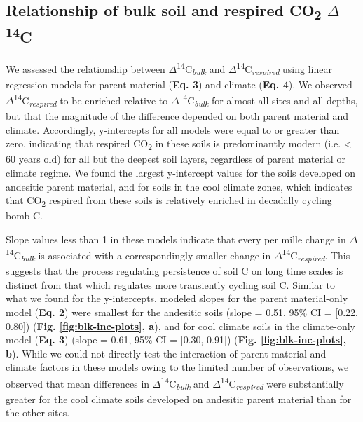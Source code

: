 \documentclass[english,man,floatsintext]{apa6}
\begin{document}
\hypertarget{relationship-of-bulk-soil-and-respired-co2-delta14c}{%
\subsection{\texorpdfstring{Relationship of bulk soil and respired CO\textsubscript{2} \(\Delta\)\textsuperscript{14}C}{Relationship of bulk soil and respired CO2 \textbackslash{}Delta14C}}\label{relationship-of-bulk-soil-and-respired-co2-delta14c}}

We assessed the relationship between \(\Delta\)\textsuperscript{14}C\textsubscript{\emph{bulk}} and \(\Delta\)\textsuperscript{14}C\textsubscript{\emph{respired}} using linear regression models for parent material (\textbf{Eq. 3}) and climate (\textbf{Eq. 4}). We observed \(\Delta\)\textsuperscript{14}C\textsubscript{\emph{respired}} to be enriched relative to \(\Delta\)\textsuperscript{14}C\textsubscript{\emph{bulk}} for almost all sites and all depths, but that the magnitude of the difference depended on both parent material and climate. Accordingly, y-intercepts for all models were equal to or greater than zero, indicating that respired CO\textsubscript{2} in these soils is predominantly modern (i.e. \textless{} 60 years old) for all but the deepest soil layers, regardless of parent material or climate regime. We found the largest y-intercept values for the soils developed on andesitic parent material, and for soils in the cool climate zones, which indicates that CO\textsubscript{2} respired from these soils is relatively enriched in decadally cycling bomb-C.

Slope values less than 1 in these models indicate that every per mille change in \(\Delta\)\textsuperscript{14}C\textsubscript{\emph{bulk}} is associated with a correspondingly smaller change in \(\Delta\)\textsuperscript{14}C\textsubscript{\emph{respired}}. This suggests that the process regulating persistence of soil C on long time scales is distinct from that which regulates more transiently cycling soil C. Similar to what we found for the y-intercepts, modeled slopes for the parent material-only model (\textbf{Eq. 2}) were smallest for the andesitic soils (slope = 0.51, 95\% CI = {[}0.22, 0.80{]}) (\textbf{Fig. \ref{fig:blk-inc-plots}, a}), and for cool climate soils in the climate-only model (\textbf{Eq. 3}) (slope = 0.61, 95\% CI = {[}0.30, 0.91{]}) (\textbf{Fig. \ref{fig:blk-inc-plots}, b}). While we could not directly test the interaction of parent material and climate factors in these models owing to the limited number of observations, we observed that mean differences in \(\Delta\)\textsuperscript{14}C\textsubscript{\emph{bulk}} and \(\Delta\)\textsuperscript{14}C\textsubscript{\emph{respired}} were substantially greater for the cool climate soils developed on andesitic parent material than for the other sites.
\end{document}
